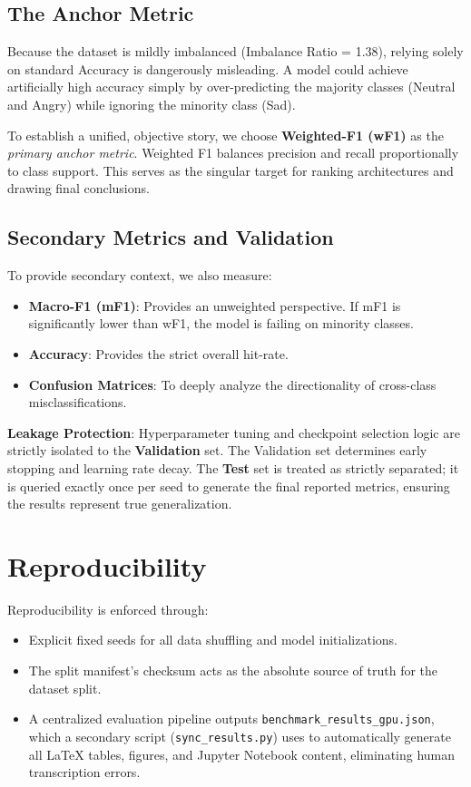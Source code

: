 \documentclass[12pt,a4paper]{report}
\begin{document}
\subsection{The Anchor Metric}
Because the dataset is mildly imbalanced (Imbalance Ratio = 1.38), relying solely on standard Accuracy is dangerously misleading. A model could achieve artificially high accuracy simply by over-predicting the majority classes (Neutral and Angry) while ignoring the minority class (Sad).

To establish a unified, objective story, we choose \textbf{Weighted-F1 (wF1)} as the \textit{primary anchor metric}. Weighted F1 balances precision and recall proportionally to class support. This serves as the singular target for ranking architectures and drawing final conclusions.

\subsection{Secondary Metrics and Validation}
To provide secondary context, we also measure:
\begin{itemize}
    \item \textbf{Macro-F1 (mF1)}: Provides an unweighted perspective. If mF1 is significantly lower than wF1, the model is failing on minority classes.
    \item \textbf{Accuracy}: Provides the strict overall hit-rate.
    \item \textbf{Confusion Matrices}: To deeply analyze the directionality of cross-class misclassifications.
\end{itemize}

\textbf{Leakage Protection}: Hyperparameter tuning and checkpoint selection logic are strictly isolated to the \textbf{Validation} set. The Validation set determines early stopping and learning rate decay. The \textbf{Test} set is treated as strictly separated; it is queried exactly once per seed to generate the final reported metrics, ensuring the results represent true generalization.

\section{Reproducibility}
Reproducibility is enforced through:
\begin{itemize}
    \item Explicit fixed seeds for all data shuffling and model initializations.
    \item The split manifest's checksum acts as the absolute source of truth for the dataset split.
    \item A centralized evaluation pipeline outputs \texttt{benchmark\_results\_gpu.json}, which a secondary script (\texttt{sync\_results.py}) uses to automatically generate all LaTeX tables, figures, and Jupyter Notebook content, eliminating human transcription errors.
\end{itemize}
\end{document}
